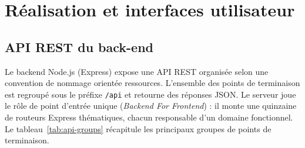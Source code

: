 \section{Réalisation et interfaces utilisateur}

\subsection{API REST du back-end}

Le backend Node.js (Express) expose une API REST organisée selon une convention de nommage
orientée ressources. L'ensemble des points de terminaison est regroupé sous le préfixe
\texttt{/api} et retourne des réponses JSON. Le serveur joue le rôle de point d'entrée unique
(\textit{Backend For Frontend}) : il monte une quinzaine de routeurs Express thématiques,
chacun responsable d'un domaine fonctionnel. Le tableau~\ref{tab:api-groups} récapitule les
principaux groupes de points de terminaison.

